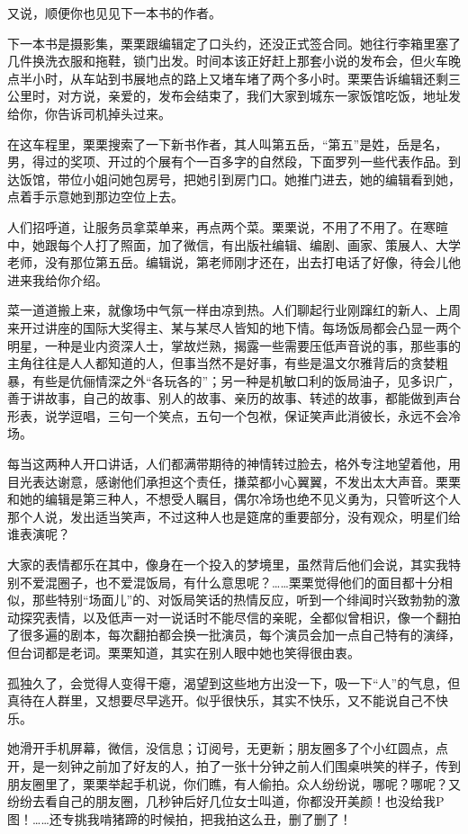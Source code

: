 \documentclass[lang=cn,newtx,12pt,scheme=chinese]{elegantbook}
\begin{document}
又说，顺便你也见见下一本书的作者。

下一本书是摄影集，栗栗跟编辑定了口头约，还没正式签合同。她往行李箱里塞了几件换洗衣服和拖鞋，锁门出发。时间本该正好赶上那套小说的发布会，但火车晚点半小时，从车站到书展地点的路上又堵车堵了两个多小时。栗栗告诉编辑还剩三公里时，对方说，亲爱的，发布会结束了，我们大家到城东一家饭馆吃饭，地址发给你，你告诉司机掉头过来。

在这车程里，栗栗搜索了一下新书作者，其人叫第五岳，“第五”是姓，岳是名，男，得过的奖项、开过的个展有个一百多字的自然段，下面罗列一些代表作品。到达饭馆，带位小姐问她包房号，把她引到房门口。她推门进去，她的编辑看到她，点着手示意她到那边空位上去。

人们招呼道，让服务员拿菜单来，再点两个菜。栗栗说，不用了不用了。在寒暄中，她跟每个人打了照面，加了微信，有出版社编辑、编剧、画家、策展人、大学老师，没有那位第五岳。编辑说，第老师刚才还在，出去打电话了好像，待会儿他进来我给你介绍。

菜一道道搬上来，就像场中气氛一样由凉到热。人们聊起行业刚蹿红的新人、上周来开过讲座的国际大奖得主、某与某尽人皆知的地下情。每场饭局都会凸显一两个明星，一种是业内资深人士，掌故烂熟，揭露一些需要压低声音说的事，那些事的主角往往是人人都知道的人，但事当然不是好事，有些是温文尔雅背后的贪婪粗暴，有些是伉俪情深之外“各玩各的”；另一种是机敏口利的饭局油子，见多识广，善于讲故事，自己的故事、别人的故事、亲历的故事、转述的故事，都能做到声台形表，说学逗唱，三句一个笑点，五句一个包袱，保证笑声此消彼长，永远不会冷场。

每当这两种人开口讲话，人们都满带期待的神情转过脸去，格外专注地望着他，用目光表达谢意，感谢他们承担这个责任，搛菜都小心翼翼，不发出太大声音。栗栗和她的编辑是第三种人，不想受人瞩目，偶尔冷场也绝不见义勇为，只管听这个人那个人说，发出适当笑声，不过这种人也是筵席的重要部分，没有观众，明星们给谁表演呢？

大家的表情都乐在其中，像身在一个投入的梦境里，虽然背后他们会说，其实我特别不爱混圈子，也不爱混饭局，有什么意思呢？……栗栗觉得他们的面目都十分相似，那些特别“场面儿”的、对饭局笑话的热情反应，听到一个绯闻时兴致勃勃的激动探究表情，以及低声一对一说话时不能尽信的亲昵，全都似曾相识，像一个翻拍了很多遍的剧本，每次翻拍都会换一批演员，每个演员会加一点自己特有的演绎，但台词都是老词。栗栗知道，其实在别人眼中她也笑得很由衷。

孤独久了，会觉得人变得干瘪，渴望到这些地方出没一下，吸一下“人”的气息，但真待在人群里，又想要尽早逃开。似乎很快乐，其实不快乐，又不能说自己不快乐。

她滑开手机屏幕，微信，没信息；订阅号，无更新；朋友圈多了个小红圆点，点开，是一刻钟之前加了好友的人，拍了一张十分钟之前人们围桌哄笑的样子，传到朋友圈里了，栗栗举起手机说，你们瞧，有人偷拍。众人纷纷说，哪呢？哪呢？又纷纷去看自己的朋友圈，几秒钟后好几位女士叫道，你都没开美颜！也没给我P图！……还专挑我啃猪蹄的时候拍，把我拍这么丑，删了删了！
\end{document}
